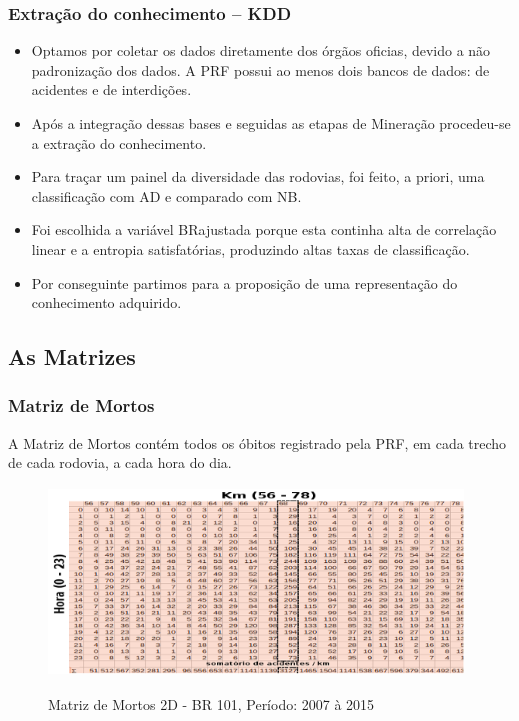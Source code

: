 \documentclass[11pt]{beamer}
\begin{document}
\begin{frame}\frametitle{ Extração do conhecimento -- KDD}
	\begin{itemize}
		\item Optamos por coletar os dados diretamente dos órgãos oficias, devido a não padronização dos dados. A PRF possui ao menos dois bancos de dados: de acidentes e de interdições.
		\pause
		\item Após a integração dessas bases e seguidas as etapas de Mineração procedeu-se a extração do conhecimento.
		\pause
		\item Para traçar um painel da diversidade das rodovias, foi feito, a priori, uma classificação com AD e comparado com NB.
		\pause
		\item Foi escolhida a variável BRajustada porque esta continha alta de correlação linear e a entropia satisfatórias, produzindo altas taxas de classificação.
		\pause
		\item Por conseguinte partimos para a proposição de uma representação do conhecimento adquirido.  
	\end{itemize}
\end{frame}

\subsection{ As Matrizes}
\begin{frame}\frametitle{ Matriz de Mortos}
	A Matriz de Mortos contém todos os óbitos registrado pela PRF, em cada trecho de cada rodovia, a cada hora do dia.
	\pause
	\transboxin[duration=1, direction=25]
	\begin{figure}[!ht]
		\centering
		\label{fig:MatrizMortos2D}
		\includegraphics[width=110mm, height=50mm]{Figuras/Metodologia/MM2d101.png}\\
		\caption{Matriz de Mortos 2D - BR 101, Período: 2007 à 2015}
	\end{figure}
\end{frame}
\end{document}
